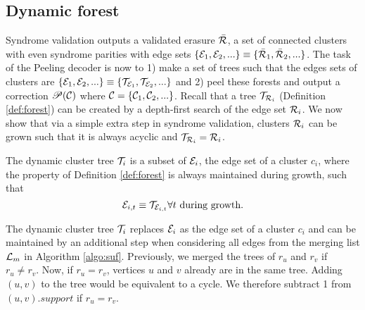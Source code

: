 
\subsection{Dynamic forest}\label{sec:dynamicforest}
Syndrome validation outputs a validated erasure $\bar{\mathcal{R}}$, a set of connected clusters with even syndrome parities with edge sets $\{\mathcal{E}_1, \mathcal{E}_2, ...\} \equiv \{\bar{\mathcal{R}}_1, \bar{\mathcal{R}}_2, ...\}$. The task of the Peeling decoder is now to 1) make a set of trees such that the edges sets of clusters are $\{\mathcal{E}_1, \mathcal{E}_2, ...\} \equiv \{\mathcal{T}_{\mathcal{E}_1}, \mathcal{T}_{\mathcal{E}_2}, ...\}$ and 2) peel these forests and output a correction $\mathscr{P}(\mathcal{C})$ where $\mathcal{C} = \{\mathcal{C}_1, \mathcal{C}_2,...\}$. Recall that a tree $\mathcal{T}_{\mathcal{R}_i}$ (Definition \ref{def:forest}) can be created by a depth-first search of the edge set $\mathcal{R}_i$. We now show that via a simple extra step in syndrome validation, clusters $\mathcal{R}_i$ can be grown such that it is always acyclic and $\mathcal{T}_{\mathcal{R}_i} = \mathcal{R}_i$. 

\begin{definition}
  The dynamic cluster tree $\mathcal{T}_i$ is a subset of $\mathcal{E}_i$, the edge set of a cluster $c_i$, where the property of Definition \ref{def:forest} is always maintained during growth, such that
  \begin{equation}
    \mathcal{E}_{i,t}\equiv\mathcal{T}_{\mathcal{E}_{i,t}} \forall t \text{ during growth}.
  \end{equation}
\end{definition}
The dynamic cluster tree $\mathcal{T}_i$ replaces $\mathcal{E}_i$ as the edge set of a cluster $c_i$ and can be maintained by an additional step when considering all edges from the merging list $\mathcal{L}_m$ in Algorithm \ref{algo:suf}. Previously, we merged the trees of $r_u$ and $r_v$ if $r_u \neq r_v$. Now, if $r_u = r_v$, vertices $u$ and $v$ already are in the same tree. Adding $(u,v)$ to the tree would be equivalent to a cycle. We therefore subtract 1 from $(u,v).support$ if $r_u = r_v$. 

